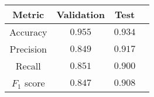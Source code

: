 \begin{tabular}{c|ccc}
    \textbf{Metric} & \textbf{Validation} & \textbf{Test} \\\hline
    Accuracy        & $0.955$             & $0.934$       \\
    Precision       & $0.849$             & $0.917$       \\
    Recall          & $0.851$             & $0.900$       \\
    $F_1$ score     & $0.847$             & $0.908$       \\
\end{tabular}
